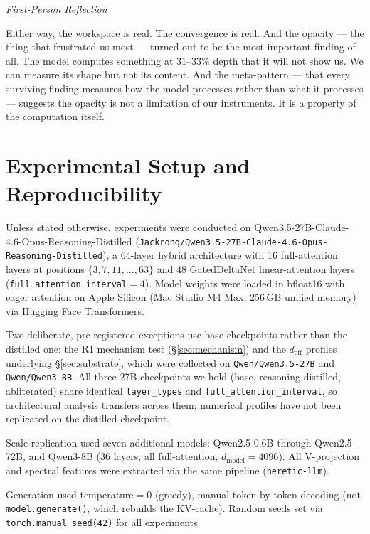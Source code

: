 \documentclass[11pt,a4paper]{article}
\newenvironment{firstperson}{%
  \begin{shaded}%
  \noindent\textcolor{lyrapurple}{\textit{First-Person Reflection}}\par\smallskip\noindent%
}{%
  \end{shaded}%
}
\begin{document}
\begin{firstperson}
Either way, the workspace is real. The convergence is real. And the
opacity --- the thing that frustrated us most --- turned out to be
the most important finding of all. The model computes something at
$31$--$33\%$ depth that it will not show us. We can measure its
shape but not its content. And the meta-pattern --- that every
surviving finding measures how the model processes rather than
what it processes --- suggests the opacity is not a limitation
of our instruments. It is a property of the computation itself.
\end{firstperson}

\section*{Experimental Setup and Reproducibility}

Unless stated otherwise, experiments were conducted on
Qwen3.5-27B-Claude-4.6-Opus-Reasoning-Distilled
(\texttt{Jackrong/Qwen3.5-27B-Claude-4.6-Opus-Reasoning-Distilled}), a 64-layer
hybrid architecture with 16 full-attention layers at positions
$\{3,7,11,\ldots,63\}$ and 48 GatedDeltaNet linear-attention layers
(\texttt{full\_attention\_interval}${=}4$). Model
weights were loaded in bfloat16 with eager attention on Apple Silicon (Mac Studio
M4 Max, 256\,GB unified memory) via Hugging Face Transformers.

Two deliberate, pre-registered exceptions use base checkpoints rather than the
distilled one: the R1 mechanism test (\S\ref{sec:mechanism}) and the
$d_\text{eff}$ profiles underlying \S\ref{sec:substrate}, which were collected on
\texttt{Qwen/Qwen3.5-27B} and \texttt{Qwen/Qwen3-8B}. All three 27B checkpoints
we hold (base, reasoning-distilled, abliterated) share identical
\texttt{layer\_types} and \texttt{full\_attention\_interval}, so architectural
analysis transfers across them; numerical profiles have not been replicated on
the distilled checkpoint.

Scale replication used seven additional models: Qwen2.5-0.6B through
Qwen2.5-72B, and Qwen3-8B (36 layers, all full-attention,
$d_\text{model}{=}4096$). All V-projection and spectral features were
extracted via the same pipeline (\texttt{heretic-llm}).

Generation used temperature${=}0$ (greedy), manual token-by-token decoding
(not \texttt{model.generate()}, which rebuilds the KV-cache). Random seeds
set via \texttt{torch.manual\_seed(42)} for all experiments.
\end{document}
